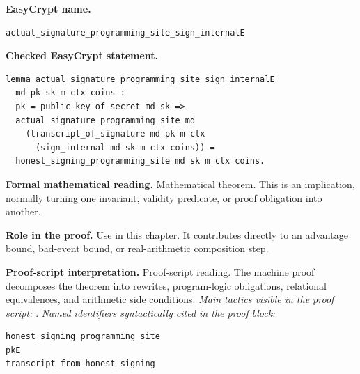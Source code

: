 \begin{formaltheorem}
\noindent\textbf{EasyCrypt name.}
\begin{lstlisting}[language=EasyCrypt,basicstyle=\ttfamily\scriptsize]
actual_signature_programming_site_sign_internalE
\end{lstlisting}
\noindent\textbf{Checked EasyCrypt statement.}
\begin{lstlisting}[language=EasyCrypt,basicstyle=\ttfamily\scriptsize]
lemma actual_signature_programming_site_sign_internalE
  md pk sk m ctx coins :
  pk = public_key_of_secret md sk =>
  actual_signature_programming_site md
    (transcript_of_signature md pk m ctx
      (sign_internal md sk m ctx coins)) =
  honest_signing_programming_site md sk m ctx coins.
\end{lstlisting}
\noindent\textbf{Formal mathematical reading.}
Mathematical theorem. This is an implication, normally turning one invariant, validity predicate, or proof obligation into another.

\noindent\textbf{Role in the proof.}
Use in this chapter. It contributes directly to an advantage bound, bad-event bound, or real-arithmetic composition step.

\noindent\textbf{Proof-script interpretation.}
Proof-script reading. The machine proof decomposes the theorem into rewrites, program-logic obligations, relational equivalences, and arithmetic side conditions.
\emph{Main tactics visible in the proof script:} .
\emph{Named identifiers syntactically cited in the proof block:}
\begin{lstlisting}[language=EasyCrypt,basicstyle=\ttfamily\scriptsize]
honest_signing_programming_site
pkE
transcript_from_honest_signing
\end{lstlisting}

\end{formaltheorem}

